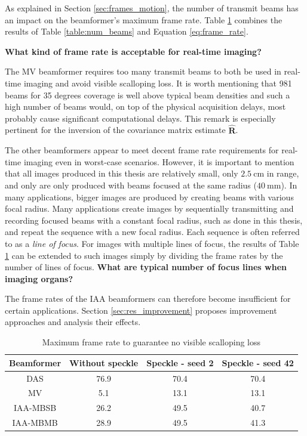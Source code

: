 \iffalse
As explained in Section \ref{sec:frames_motion}, the number of transmit beams has an impact on the beamformer's maximum frame rate. Table \ref{table:max_frame} combines the results of Table \ref{table:num_beams} and Equation \ref{eq:frame_rate}.

\textbf{What kind of frame rate is acceptable for real-time imaging?}

The MV beamformer requires too many transmit beams to both be used in real-time imaging and avoid visible scalloping loss. It is worth mentioning that 981 beams for 35 degrees coverage is well above typical beam densities and such a high number of beams would, on top of the physical acquisition delays, most probably cause significant computational delays. This remark is especially pertinent for the inversion of the covariance matrix estimate $\boldsymbol{\hat{R}}$.

The other beamformers appear to meet decent frame rate requirements for real-time imaging even in worst-case scenarios. However, it is important to mention that all images produced in this thesis are relatively small, only $2.5~$cm in range, and only are only produced with beams focused at the same radius ($40~$mm). In many applications, bigger images are produced by creating beams with various focal radius. Many applications create images by sequentially transmitting and recording focused beams with a constant focal radius, such as done in this thesis, and repeat the sequence with a new focal radius. Each sequence is often referred to as a \textit{line of focus}. For images with multiple lines of focus, the results of Table \ref{table:max_frame} can be extended to such images simply by dividing the frame rates by the number of lines of focus.
\textbf{What are typical number of focus lines when imaging organs?}

The frame rates of the IAA beamformers can therefore become insufficient for certain applications. Section \ref{sec:res_improvement} proposes improvement approaches and analysis their effects.

\begin{table}[!ht]
\centering
\begin{tabular}{| c | c | c | c |}
  \hline
  Beamformer &   Without speckle   &   Speckle - seed 2 &   Speckle - seed 42 \\
  \hline
  DAS       &   76.9     &   70.4 &   70.4  \\
  MV        &   5.1      &   13.1 &   13.1  \\
  IAA-MBSB  &   26.2     &   49.5 &   40.7  \\
  IAA-MBMB  &   28.9     &   49.5 &   41.3  \\
  \hline
 \end{tabular}
\caption{Maximum frame rate to guarantee no visible scalloping loss}
\label{table:max_frame}
\end{table}


